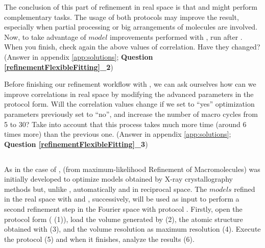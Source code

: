   The conclusion of this part of refinement in real space is that \coot and \phenix {} might perform complementary tasks. The usage of both protocols may improve the result, especially when partial processing or big arrangements of molecules are involved. Now, to take advantage of $model$ improvements performed with \coot, run \phenix {} after \coot. When you finish, check again the above values of correlation. Have they changed? (Answer in appendix \ref{app:solutions}; \textbf{Question \ref{refinementFlexibleFitting}\_2})
  
  Before finishing our refinement workflow with , we can ask ourselves how can we improve correlations in real space by modifying the advanced parameters in the protocol form. Will the correlation values change if we set to ``yes'' optimization parameters previously set to ``no'', and increase the number of macro cycles from 5 to 30? Take into account that this process takes much more time (around 6 times more) than the previous one. (Answer in appendix \ref{app:solutions}; \textbf{Question \ref{refinementFlexibleFitting}\_3})\\
  
  \subsection*{  }
  
  As in the case of \coot,  (from maximum-likelihood Refinement of Macromolecules) was initially developed to optimize models obtained by X-ray crystallography methods but, unlike \coot, automatically and in reciprocal space. The $models$ refined in the real space with \coot and \phenix {}, successively, will be used as input to perform a second refinement step in the Fourier space with  protocol . Firstly, open the  protocol form ( (1)), load the volume generated by \coot (2), the atomic structure obtained with \phenix {} (3), and the volume resolution as maximum resolution (4). Execute the protocol (5) and when it finishes, analyze the results (6).
  
